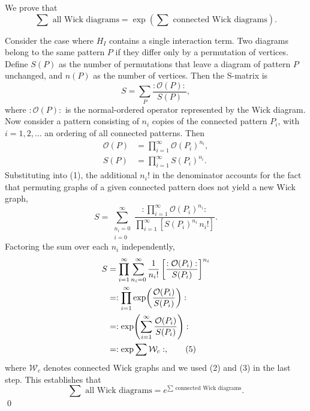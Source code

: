 We prove that
\begin{equation}
	\sum\text{ all Wick diagrams} = \exp\!\left(\sum\text{ connected Wick diagrams}\right).
\end{equation}

Consider the case where $H_I$ contains a single interaction term. Two
diagrams belong to the same pattern $P$ if they differ only by a
permutation of vertices. Define $S(P)$ as the number of permutations
that leave a diagram of pattern $P$ unchanged, and $n(P)$ as the number
of vertices. Then the S-matrix is
\begin{equation}
	S = \sum_P\frac{:\mathcal{O}(P):}{S(P)},
	\tag{1}
\end{equation}
where $:\mathcal{O}(P):$ is the normal-ordered operator represented by
the Wick diagram. Now consider a pattern consisting of $n_i$ copies of
the connected pattern $P_i$, with $i = 1,2,\ldots$ an ordering of all
connected patterns. Then
\begin{align}
	\mathcal{O}(P) & = \prod_{i=1}^{\infty}\mathcal{O}(P_i)^{n_i},
	\tag{2}                                                        \\
	S(P)           & = \prod_{i=1}^{\infty}S(P_i)^{n_i}.
	\tag{3}
\end{align}
Substituting into (1), the additional $n_i!$ in the denominator accounts
for the fact that permuting graphs of a given connected pattern does not
yield a new Wick graph,
\begin{equation}
	S = \sum_{\substack{n_i=0\\i=0}}^{\infty}
	\frac{:\prod_{i=1}^{\infty}\mathcal{O}(P_i)^{n_i}:}
	{\prod_{i=1}^{\infty}\left[S(P_i)^{n_i}\,n_i!\right]}.
	\tag{4}
\end{equation}
Factoring the sum over each $n_i$ independently,
\begin{align}
	S & = \prod_{i=1}^{\infty}\sum_{n_i=0}^{\infty}
	\frac{1}{n_i!}\left[\frac{:\mathcal{O}(P_i):}{S(P_i)}\right]^{n_i}
	\notag                                                                 \\
	  & = :\prod_{i=1}^{\infty}\exp\!\left(\frac{\mathcal{O}(P_i)}{S(P_i)}
	\right): \notag                                                        \\
	  & = :\exp\!\left(\sum_{i=1}^{\infty}
	\frac{\mathcal{O}(P_i)}{S(P_i)}\right): \notag                         \\
	  & = :\exp\sum\mathcal{W}_c:,
	\tag{5}
\end{align}
where $\mathcal{W}_c$ denotes connected Wick graphs and we used (2) and
(3) in the last step. This establishes that
\begin{equation}
	\sum\text{ all Wick diagrams} = e^{\sum\text{ connected Wick diagrams}}.
	\tag{6}
\end{equation}
\qed

